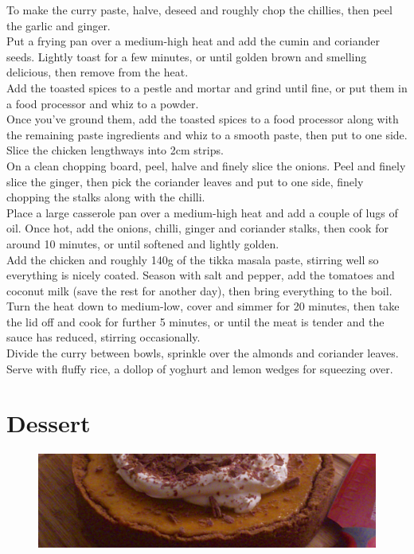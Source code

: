 \documentclass{tufte-book}
\begin{document}
To make the curry paste, halve, deseed and roughly chop the chillies, then peel the garlic and ginger. 
\\Put a frying pan over a medium-high heat and add the cumin and coriander seeds. Lightly toast for a few minutes, or until golden brown and smelling delicious, then remove from the heat. 
\\Add the toasted spices to a pestle and mortar and grind until fine, or put them in a food processor and whiz to a powder. 
\\Once you've ground them, add the toasted spices to a food processor along with the remaining paste ingredients and whiz to a smooth paste, then put to one side.
\\Slice the chicken lengthways into 2cm strips. 
\\On a clean chopping board, peel, halve and finely slice the onions. Peel and finely slice the ginger, then pick the coriander leaves and put to one side, finely chopping the stalks along with the chilli.
\\Place a large casserole pan over a medium-high heat and add a couple of lugs of oil. Once hot, add the onions, chilli, ginger and coriander stalks, then cook for around 10 minutes, or until softened and lightly golden. 
\\Add the chicken and roughly 140g of the tikka masala paste, stirring well so everything is nicely coated. Season with salt and pepper, add the tomatoes and coconut milk (save the rest for another day), then bring everything to the boil.
\\Turn the heat down to medium-low, cover and simmer for 20 minutes, then take the lid off and cook for further 5 minutes, or until the meat is tender and the sauce has reduced, stirring occasionally. 
\\Divide the curry between bowls, sprinkle over the almonds and coriander leaves. Serve with fluffy rice, a dollop of yoghurt and lemon wedges for squeezing over.


\chapter{Dessert}

\begin{figure}[h]
  \includegraphics[width=\linewidth]{pumpkinpie.jpg}%
\end{figure}
\end{document}
